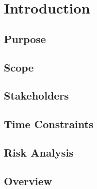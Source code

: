\chapter{Introduction}

\section{Purpose}

\section{Scope}

\section{Stakeholders}

\section{Time Constraints}

\section{Risk Analysis}

\section{Overview}
